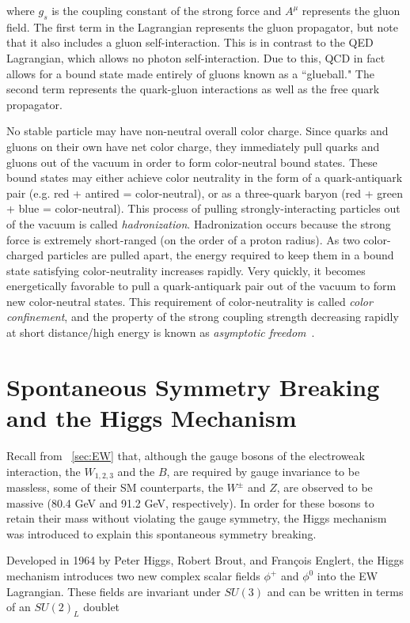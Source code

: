 \noindent where $g_{s}$ is the coupling constant of the strong force and $A^{\mu}$ represents the gluon field. The first term in the Lagrangian represents the gluon propagator, but note that it also includes a gluon self-interaction. This is in contrast to the QED Lagrangian, which allows no photon self-interaction. Due to this, QCD in fact allows for a bound state made entirely of gluons known as a ``glueball." The second term represents the quark-gluon interactions as well as the free quark propagator.

No stable particle may have non-neutral overall color charge. Since quarks and gluons on their own have net color charge, they immediately pull quarks and gluons out of the vacuum in order to form color-neutral bound states. These bound states may either achieve color neutrality in the form of a quark-antiquark pair (e.g. red + antired = color-neutral), or as a three-quark baryon (red + green + blue = color-neutral). This process of pulling strongly-interacting particles out of the vacuum is called \textit{hadronization}. Hadronization occurs because the strong force is extremely short-ranged (on the order of a proton radius). As two color-charged particles are pulled apart, the energy required to keep them in a bound state satisfying color-neutrality increases rapidly. Very quickly, it becomes energetically favorable to pull a quark-antiquark pair out of the vacuum to form new color-neutral states. This requirement of color-neutrality is called \textit{color confinement}, and the property of the strong coupling strength decreasing rapidly at short distance/high energy is known as \textit{asymptotic freedom}~\cite{halzen}.


\section{Spontaneous Symmetry Breaking and the Higgs Mechanism}

Recall from ~\ref{sec:EW} that, although the gauge bosons of the electroweak interaction, the $W_{1,2,3}$ and the $B$, are required by gauge invariance to be massless, some of their SM counterparts, the $W^{\pm}$ and $Z$, are observed to be massive (80.4 GeV and 91.2 GeV, respectively). In order for these bosons to retain their mass without violating the gauge symmetry, the Higgs mechanism was introduced to explain this spontaneous symmetry breaking.

Developed in 1964 by Peter Higgs, Robert Brout, and Fran\c{c}ois Englert, the Higgs mechanism introduces two new complex scalar fields $\phi^{+}$ and $\phi^0$ into the EW Lagrangian. These fields are invariant under $SU(3)$ and can be written in terms of an $SU(2)_L$ doublet 

